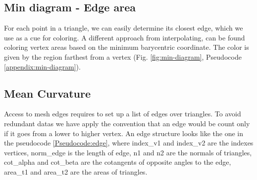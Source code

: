\subsection{Min diagram - Edge area} \label{section:min-diagram}
For each point in a triangle, we can easily determine its closest edge, which we use as a cue for coloring.
A different approach from interpolating, can be found coloring vertex areas based on the minimum barycentric coordinate.
The color is given by the region farthest from a vertex (Fig. \ref{fig:min-diagram}, Pseudocode \ref{appendix:min-diagram}).

\subsection{Mean Curvature} \label{section:edge-struct} \label{section:mc-curvature}
Access to mesh edges requires to set up a list of edges over triangles. To avoid redundant datas we have apply the convention that an edge would be count only if it goes from a lower to higher vertex. An edge structure looks like the one in the pseudocode \ref{Pseudocode:edge}, where index\_v1 and index\_v2 are the indexes vertices, norm\_edge is the length of edge, n1 and n2 are the normals of triangles, cot\_alpha and cot\_beta are the cotangents of opposite angles to the edge, area\_t1 and area\_t2 are the areas of triangles.

